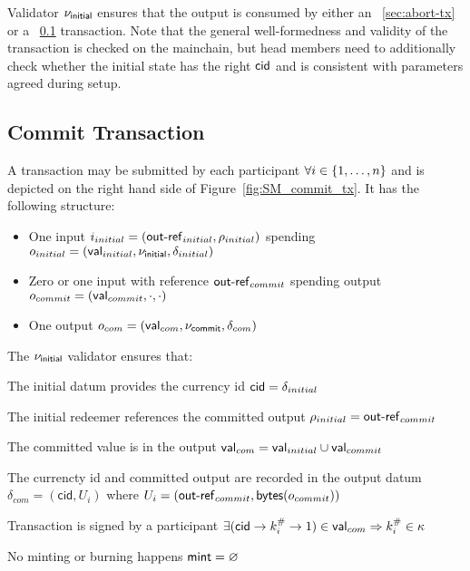 \noindent Validator $\nu_\mathsf{initial}$ ensures that the output is consumed by either
an \mtxAbort{}~\ref{sec:abort-tx} or a \mtxCom{}~\ref{sec:commit-tx}
transaction. Note that the general well-formedness and validity of the
\mtxInit{} transaction is checked on the mainchain, but head members need to
additionally check whether the initial state has the right $\mathsf{cid}$ and is
consistent with parameters agreed during setup.



\subsection{Commit Transaction}\label{sec:commit-tx}

A \mtxCom{} transaction may be submitted by each participant
$\forall i \in \{1, \ldots, n\}$ and is depicted on the right hand side of
Figure~\ref{fig:SM_commit_tx}. It has the following structure:
\begin{itemize}
  \item One input $i_{initial} = (\mathsf{out\textsf{-}{}ref}_{initial}, \rho_{initial})$
        spending $o_{initial} = (\mathsf{val}_{initial}, \nu_\mathsf{initial}, \delta_{initial})$
  \item Zero or one input with reference $\mathsf{out\textsf{-}{}ref}_{commit}$ spending output
        $o_{commit} = (\mathsf{val}_{commit}, \cdot , \cdot)$
  \item One output $o_{com} = (\mathsf{val}_{com}, \nu_\mathsf{commit}, \delta_{com})$
\end{itemize}

\noindent The $\nu_\mathsf{initial}$ validator ensures that:
\begin{menumerate}
  \item The initial datum provides the currency id $\mathsf{cid} = \delta_{initial}$
  \item The initial redeemer references the committed output $\rho_{initial} = \mathsf{out\textsf{-}{}ref}_{commit}$
  \item The committed value is in the output $\mathsf{val}_{com} = \mathsf{val}_{initial} \cup \mathsf{val}_{commit}$
  \item The currencty id and committed output are recorded in the output datum
  $\delta_{com} = (\mathsf{cid}, U_{i})$ where
  $U_{i} = (\mathsf{out\textsf{-}{}ref}_{commit},\mathsf{bytes}(o_{commit}))$
  \item Transaction is signed by a participant $\exists (\mathsf{cid} \rightarrow k^{\#}_{i} \rightarrow 1) \in \mathsf{val}_{com} \Rightarrow k^{\#}_{i} \in \kappa$
  \item No minting or burning happens $\mathsf{mint} = \varnothing$
\end{menumerate}

